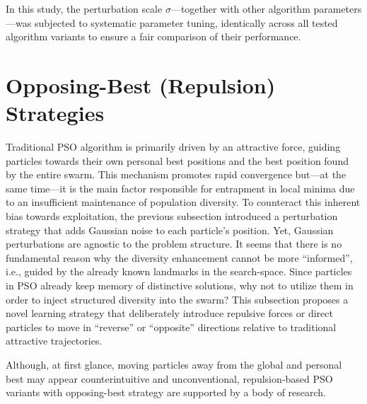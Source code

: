 {%

In this study, the perturbation scale $\sigma$---together with other algorithm parameters---was subjected to systematic parameter tuning, identically across all tested algorithm variants to ensure a fair comparison of their performance.


\section{Opposing-Best (Repulsion) Strategies}

Traditional PSO algorithm is primarily driven by an attractive force, guiding particles towards their own personal best positions and the best position found by the entire swarm. This mechanism promotes rapid convergence but---at the same time---it is the main factor responsible for entrapment in local minima due to an insufficient maintenance of population diversity. To counteract this inherent bias towards exploitation, the previous subsection introduced a perturbation strategy that adds Gaussian noise to each particle's position.
Yet, Gaussian perturbations are agnostic to the problem structure. It seems that there is no fundamental reason why the diversity enhancement cannot be more ``informed'', i.e., 
guided by the already known landmarks in the \gls{search-space}.
Since particles in PSO already keep memory of distinctive solutions, why not to utilize them in order to inject structured diversity into the swarm?
This subsection proposes a novel learning strategy that deliberately introduce repulsive forces or direct particles to move in ``reverse''
or ``opposite'' directions relative to traditional attractive trajectories.




Although, at first glance, moving particles away from the global and personal best may appear counterintuitive  and unconventional, repulsion‐based PSO variants with opposing-best strategy are supported by a body of research.


}
